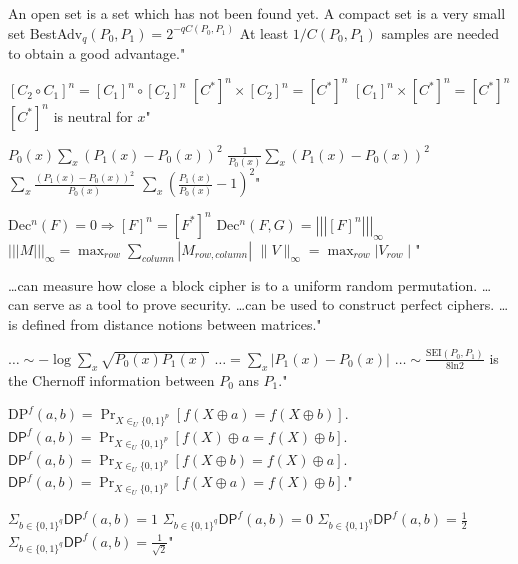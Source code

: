 {An open set is a set which has not been found yet.}
{A compact set is a very small set}
{BestAdv$_q(P_0,P_1)=2^{-qC(P_0,P_1)}$}
{At least ${1}/{C(P_0,P_1)}$ samples are needed to obtain a good advantage."}

{$[C_2\circ C_1]^n=[C_1]^n\circ [C_2]^n$}
{$[C^*]^n\times [C_2]^n=[C^*]^n$}
{$[C_1]^n\times [C^*]^n=[C^*]^n$}
{$[C^*]^n$ is neutral for $x$"}

{$\displaystyle P_0(x)\sum_x(P_1(x)-P_0(x))^2$}
{$\displaystyle\frac{1}{P_0(x)}\sum_x(P_1(x)-P_0(x))^2$}
{$\displaystyle\sum_x\frac{(P_1(x)-P_0(x))^2}{P_0(x)}$}
{$\displaystyle\sum_x\left(\frac{P_1(x)}{P_0(x)}-1\right)^2$"}

{Dec$^n(F)=0\Rightarrow [F]^n=[F^*]^n$}
{Dec$^n(F,G)=\left|\left|\left| [F]^n\right|\right|\right|_\infty$}
{$\displaystyle\left|\left|\left| M\right|\right|\right|_\infty=\max_{row}\sum_{column}\left| M_{row,column}\right|$}
{$\displaystyle\| V\|_\infty=\max_{row}{\mid V_{row}\mid}$"}

{\ldots can measure how close a block cipher is to a uniform random permutation.}
{\ldots can serve as a tool to prove security.}
{\ldots can be used to construct perfect ciphers.}
{\ldots is defined from distance notions between matrices."}

{$\ldots\displaystyle\sim-\log{\sum_{x}\sqrt{P_0(x)P_1(x)}}$}
{$\ldots=\displaystyle\sum_{x}\left|P_1(x)-P_0(x)\right|$}
{$\ldots\displaystyle\sim\frac{\mbox{SEI}(P_0,P_1)}{8\mbox{ln}2}$}
{is the Chernoff information between $P_0$ ans $P_1$."}

{$\mathrm{DP}^f(a,b)=\Pr_{X\in _U \{0,1\}^p} [f(X\oplus a)=f(X\oplus b)] $.}
{$\mathsf{DP}^f(a,b)=\Pr_{X\in _U \{0,1\}^p} [f(X)\oplus a=f(X)\oplus b] $.}
{$\mathsf{DP}^f(a,b)=\Pr_{X\in _U \{0,1\}^p} [f(X\oplus b)=f(X)\oplus a] $.}
{$\mathsf{DP}^f(a,b)=\Pr_{X\in _U \{0,1\}^p} [f(X\oplus a)=f(X)\oplus b] $."}

{$\Sigma _{b\in \{0,1\}^q}\mathsf{DP}^f(a,b)=1$}
{$\Sigma _{b\in \{0,1\}^q}\mathsf{DP}^f(a,b)=0$}
{$\Sigma _{b\in \{0,1\}^q}\mathsf{DP}^f(a,b)=\frac{1}{2}$}
{$\Sigma _{b\in \{0,1\}^q}\mathsf{DP}^f(a,b)=\frac{1}{\sqrt{2}}$"}

